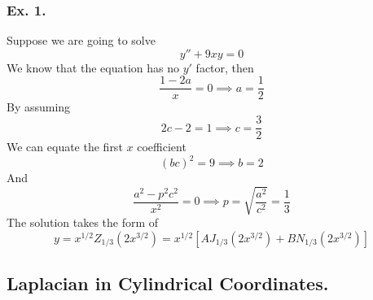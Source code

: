 \documentclass[../../main.tex]{subfiles}
\begin{document}
\subsubsection*{Ex. 1.} Suppose we are going to solve 
\begin{equation*}
  y'' +9xy=0
\end{equation*}
We know that the equation has no $y'$ factor, then 
\begin{equation*}
  \frac{1-2a}{x}=0\implies a=\frac{1}{2}
\end{equation*}
By assuming
\begin{equation*}
  2c-2=1\implies c=\frac{3}{2}
\end{equation*}
We can equate the first $x$ coefficient
\begin{equation*}
  (bc)^2=9\implies b=2
\end{equation*}
And
\begin{equation*}
  \frac{a^2-p^2c^2}{x^2}=0\implies p=\sqrt{\frac{a^2}{c^2}}=\frac{1}{3}
\end{equation*}
The solution takes the form of 
\begin{equation*}
  y=x^{1/2}Z_{1/3}(2x^{3/2})=x^{1/2}\left[AJ_{1/3}(2x^{3/2})+BN_{1/3}(2x^{3/2})\right]
\end{equation*}

\subsection*{Laplacian in Cylindrical Coordinates.}
\end{document}
